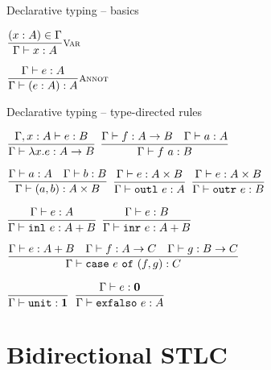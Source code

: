 \documentclass{beamer}
\newcommand{\Fun}[2]{#1 \to #2}
\newcommand{\Prod}[2]{#1 \times #2}
\newcommand{\Sum}[2]{#1 + #2}
\newcommand{\Unit}{\textbf{1}}
\newcommand{\Empty}{\textbf{0}}
\newcommand{\annot}[2]{(#1 : #2)}
\newcommand{\fun}[2]{\lambda #1. #2}
\newcommand{\app}[2]{#1\ #2}
\newcommand{\pair}[2]{(#1, #2)}
\newcommand{\outl}[1][]{\texttt{outl}\ #1}
\newcommand{\outr}[1][]{\texttt{outr}\ #1}
\newcommand{\inl}[1][]{\texttt{inl}\ #1}
\newcommand{\inr}[1][]{\texttt{inr}\ #1}
\newcommand{\case}[3]{\texttt{case}\ #1\ \texttt{of}\ (#2, #3)}
\newcommand{\unit}{\texttt{unit}}
\newcommand{\exfalso}[1][]{\texttt{exfalso}\ #1}
\newcommand{\fulltyping}[3]{#1 \vdash #2 : #3}
\newcommand{\typing}[2]{\fulltyping{\Gamma}{#1}{#2}}
\newcommand{\infrule}[3][]{\displaystyle \frac{#2}{#3} \textsc{\footnotesize{#1}}}
\newcommand{\extend}[3]{#1, #2 : #3}
\newcommand{\sidecond}[1]{#1}
\begin{document}
\begin{frame}{Declarative typing -- basics}

\begin{center}
  $\infrule[Var]{\sidecond{(x : A) \in \Gamma}}{\typing{x}{A}}$

  \vspace{2em}

  $\infrule[Annot]{\typing{e}{A}}{\typing{\annot{e}{A}}{A}}$
\end{center}

\end{frame}

\begin{frame}{Declarative typing -- type-directed rules}

\begin{center}
  $\infrule{\fulltyping{\extend{\Gamma}{x}{A}}{e}{B}}{\typing{\fun{x}{e}}{\Fun{A}{B}}}$ \quad
  $\infrule{\typing{f}{\Fun{A}{B}} \quad \typing{a}{A}}{\typing{\app{f}{a}}{B}}$

  \vspace{2em}

  $\infrule{\typing{a}{A} \quad \typing{b}{B}}{\typing{\pair{a}{b}}{\Prod{A}{B}}}$ \quad
  $\infrule{\typing{e}{\Prod{A}{B}}}{\typing{\outl[e]}{A}}$ \quad
  $\infrule{\typing{e}{\Prod{A}{B}}}{\typing{\outr[e]}{B}}$

  \vspace{2em}

  $\infrule{\typing{e}{A}}{\typing{\inl[e]}{\Sum{A}{B}}}$ \quad
  $\infrule{\typing{e}{B}}{\typing{\inr[e]}{\Sum{A}{B}}}$

  \vspace{2em}

  $\infrule{\typing{e}{\Sum{A}{B}} \quad \typing{f}{\Fun{A}{C}} \quad \typing{g}{\Fun{B}{C}}}{\typing{\case{e}{f}{g}}{C}}$

  \vspace{2em}

  $\infrule{}{\typing{\unit}{\Unit}}$ \quad
  $\infrule{\typing{e}{\Empty}}{\typing{\exfalso[e]}{A}}$
\end{center}

\end{frame}

\section{Bidirectional STLC}

\newcommand{\fullcheck}[3]{#1 \vdash #2 \mathcolor{blue}{\Leftarrow} #3}
\renewcommand{\check}[2]{\fullcheck{\Gamma}{#1}{#2}}
\end{document}
